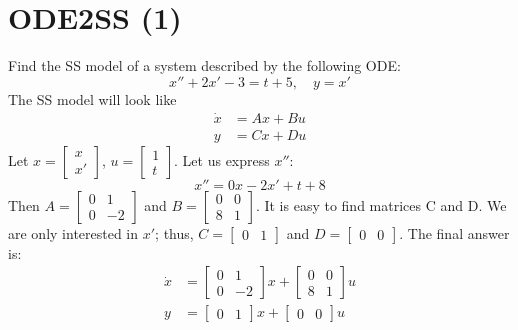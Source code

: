 \documentclass{article}
\begin{document}
\section{ODE2SS (1)}
    Find the SS model of a system described by the following ODE:
    \begin{equation}
        x'' + 2x' - 3 = t + 5, \quad y = x'
    \end{equation}
    The SS model will look like
    \begin{align}
        \dot{x} &= Ax + Bu\\
        y &= Cx + Du
    \end{align}
    Let
    $x = \begin{bmatrix}
        x\\ 
        x'
    \end{bmatrix}$, 
    $u = \begin{bmatrix}
        1\\
        t
    \end{bmatrix}
    $. Let us express $x''$:
    \begin{equation}
        x'' = 0x - 2x' + t + 8
    \end{equation}
    Then 
    $A = \begin{bmatrix}
        0 & 1\\
        0 & -2
    \end{bmatrix}
    $ 
    and 
    $B = \begin{bmatrix}
        0 & 0\\
        8 & 1
    \end{bmatrix}
    $. It is easy to find matrices C and D. We are only interested in $x'$; thus, 
    $C = \begin{bmatrix}
        0 & 1
    \end{bmatrix}$
    and 
    $D = \begin{bmatrix}
        0 & 0
    \end{bmatrix}$.
    The final answer is:
    \begin{align}
        \dot{x} &=
        \begin{bmatrix}
            0 & 1\\
            0 & -2
        \end{bmatrix}
        x + 
        \begin{bmatrix}
            0 & 0\\
            8 & 1
        \end{bmatrix}
        u\\
        y &= 
        \begin{bmatrix}
            0 & 1
        \end{bmatrix}
        x + 
        \begin{bmatrix}
            0 & 0
        \end{bmatrix}
        u
    \end{align}
    
\end{document}
